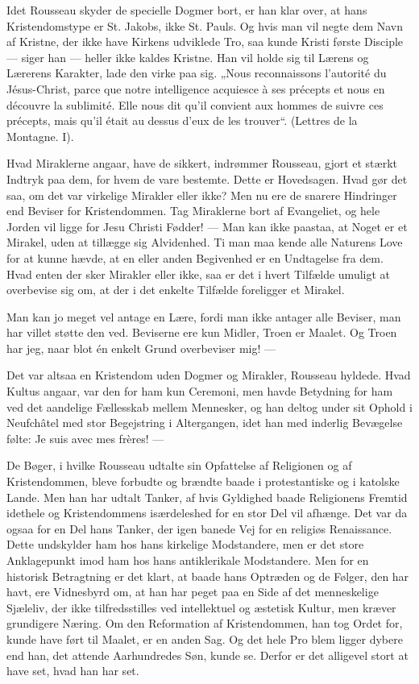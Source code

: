 \documentclass[12pt,a4paper,openany]{book}
\newcommand{\opage}[1]{\marginnote{\footnotesize\textit{[#1]}}}
\begin{document}
Idet Rousseau skyder de specielle Dogmer bort, er han
klar over, at hans Kristendomstype er St. Jakobs, ikke St. Pauls.
Og hvis man vil negte dem Navn af Kristne, der ikke have
Kirkens udviklede Tro, saa kunde Kristi første Disciple ---
siger han --- heller ikke kaldes Kristne. Han vil holde sig til
Lærens og Lærerens Karakter, lade den virke paa sig. „Nous
reconnaissons l’autorité du Jésus-Christ, parce que notre intelligence
acquiesce à ses précepts et nous en découvre la sublimité.
Elle nous dit qu’il convient aux hommes de suivre ces précepts,
mais qu’il était au dessus d’eux de les trouver“. (Lettres de la
Montagne. I).

\setcounter{footnote}{0}%
\opage{157}Hvad Miraklerne angaar, have de sikkert, indrømmer Rousseau,
gjort et stærkt Indtryk paa dem, for hvem de vare bestemte.
Dette er Hovedsagen. Hvad gør det saa, om det var
virkelige Mirakler eller ikke? Men nu ere de snarere Hindringer
end Beviser for Kristendommen. Tag Miraklerne bort af Evangeliet,
og hele Jorden vil ligge for Jesu Christi Fødder!
--- Man kan ikke paastaa, at Noget er et Mirakel, uden at tillægge
sig Alvidenhed. Ti man maa kende alle Naturens Love for at
kunne hævde, at en eller anden Begivenhed er en Undtagelse
fra dem. Hvad enten der sker Mirakler eller ikke, saa er det
i hvert Tilfælde umuligt at overbevise sig om, at der i det enkelte
Tilfælde foreligger et Mirakel.

Man kan jo meget vel antage en Lære, fordi man ikke
antager alle Beviser, man har villet støtte den ved. Beviserne
ere kun Midler, Troen er Maalet. Og Troen har jeg, naar blot
én enkelt Grund overbeviser mig! ---

Det var altsaa en Kristendom uden Dogmer og Mirakler,
Rousseau hyldede. Hvad Kultus angaar, var den for ham kun
Ceremoni, men havde Betydning for ham ved det aandelige
Fællesskab mellem Mennesker, og han deltog under sit Ophold
i Neufchâtel med stor Begejstring i Altergangen, idet han med
inderlig Bevægelse følte: Je suis avec mes frères! ---

De Bøger, i hvilke Rousseau udtalte sin Opfattelse af Religionen
og af Kristendommen, bleve forbudte og brændte baade
i protestantiske og i katolske Lande. Men han har udtalt Tanker,
af hvis Gyldighed baade Religionens Fremtid idethele og Kristendommens
isærdeleshed for en stor Del vil afhænge. Det
var da ogsaa for en Del hans Tanker, der igen banede Vej for
en religiøs Renaissance. Dette undskylder ham hos hans kirkelige
Modstandere, men er det store Anklagepunkt imod ham
hos hans antiklerikale Modstandere. Men for en historisk Betragtning
er det klart, at baade hans Optræden og de Følger,
den har havt, ere Vidnesbyrd om, at han har peget paa en
Side af det menneskelige Sjæleliv, der ikke tilfredsstilles ved
intellektuel og æstetisk Kultur, men kræver grundigere Næring.
Om den Reformation af Kristendommen, han tog Ordet for,
kunde have ført til Maalet, er en anden Sag. Og det hele Pro%
\setcounter{footnote}{0}%
\opage{158}blem ligger dybere end han, det attende Aarhundredes Søn,
kunde se. Derfor er det alligevel stort at have set, hvad han
har set.
\end{document}

